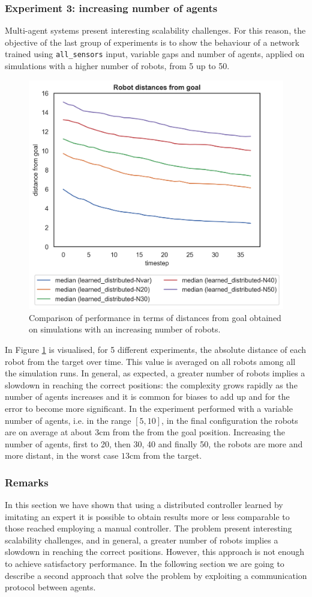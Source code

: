 \subsubsection{Experiment 3: increasing number of agents}
\label{subsubsec:task1-exp-distr-3}
Multi-agent systems present interesting scalability challenges. For this reason, the 
objective of the last group of experiments is to show the behaviour of a network 
trained using \texttt{all\_sensors} input, variable gaps and number of agents, 
applied on simulations with a higher number of robots, from 5 up to 50.
\begin{figure}[!htb]
	\centering
	\includegraphics[width=.5\textwidth]{contents/images/distances-from-goal-compressed-distributed}%
	\caption[Evaluation of distances from goal for a high number of 
	robots.]{Comparison of performance in terms of distances from goal obtained 
	on simulations with an increasing number of robots.}
	\label{fig:distdistr}
\end{figure}
In Figure \ref{fig:distdistr} is visualised, for 5 different experiments, the absolute 
distance of each robot from the target over time. This value is averaged on all 
robots among all the simulation runs. 
In general, as expected, a greater number of robots implies a slowdown in 
reaching the correct positions: the complexity grows rapidly as the number of 
agents increases and it is common for biases to add up and for the error to 
become more significant.
In the experiment performed with a variable number of agents, i.e. in the range 
$[5, 10]$, in the final configuration the robots are on average at about $3$cm 
from the from the goal position. Increasing the number of agents, first to 20, then 
30, 40 and finally 50, the robots are more and more distant, in the worst case 
$13$cm from the target.


\subsubsection{Remarks}
\label{subsubsec:remarks-task1-dist}
In this section we have shown that using a distributed controller learned by 
imitating an expert it is possible to obtain results more or less comparable to 
those reached employing a manual controller.
The problem present interesting scalability challenges, and in general, a greater 
number of robots implies a slowdown in reaching the correct positions.
However, this approach is not enough to achieve satisfactory performance. In the 
following section we are going to describe a second approach that solve the 
problem by exploiting a communication protocol between agents.